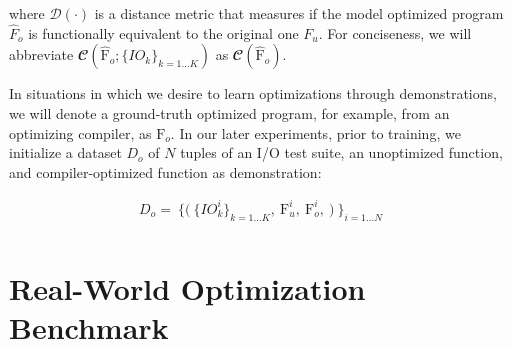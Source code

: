 \documentclass{article}
\begin{document}
where $\mathcal{D}(\cdot)$ is a distance metric that measures if the model optimized program $\hat{F}_o$ is functionally equivalent to the original one $F_u$. For conciseness, we will abbreviate $\mathbfcal{C} (\hat{\textrm{F}}_{o}; \{IO_k\}_{k=1...K})$  as $\mathbfcal{C} (\hat{\textrm{F}}_{o})$. 

In situations in which we desire to learn optimizations through demonstrations, we will denote a ground-truth optimized program, for example, from an optimizing compiler, as $\textrm{F}_o$. In our later experiments, prior to training, we initialize a dataset $D_o$ of $N$ tuples of an I/O test suite, an unoptimized function, and compiler-optimized function as demonstration: 

\begin{equation} 
    \begin{split}
    \label{eqn:init_dataset}
        D_o = \
                \bigg\{
                    \Big( \
                        \{IO_k^i\}_{k=1...K}, \
                        \textrm{F}_{u}^i, \
                        \textrm{F}_{o}^i, \
                    \Big) \
                \bigg\}_{i = 1...N} \\
    \end{split}
\end{equation}



\section{Real-World Optimization Benchmark}


\end{document}
